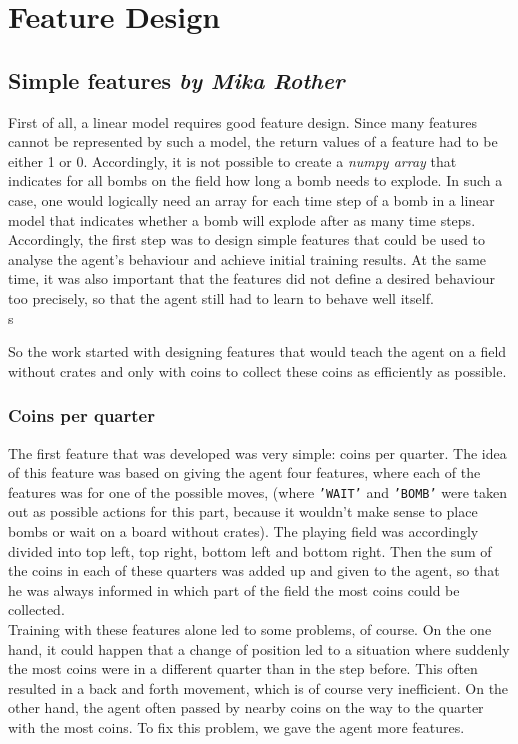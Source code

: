 \chapter{Feature Design}
\section[Simple features]{Simple features \hfill \small \normalfont\textit{by Mika Rother}}
First of all, a linear model requires good feature design. Since many features cannot be represented by such a model, the return values of a feature had to be either 1 or 0. Accordingly, it is not possible to create a \textit{numpy array} that indicates for all bombs on the field how long a bomb needs to explode. In such a case, one would logically need an array for each time step of a bomb in a linear model that indicates whether a bomb will explode after as many time steps.
\\

Accordingly, the first step was to design simple features that could be used to analyse the agent's behaviour and achieve initial training results. At the same time, it was also important that the features did not define a desired behaviour too precisely, so that the agent still had to learn to behave well itself. 
\\s

So the work started with designing features that would teach the agent on a field without crates and only with coins to collect these coins as efficiently as possible.

\subsection{Coins per quarter}
The first feature that was developed was very simple: coins per quarter. The idea of this feature was based on giving the agent four features, where each of the features was for one of the possible moves, (where \texttt{'WAIT'} and \texttt{'BOMB'} were taken out as possible actions for this part, because it wouldn't make sense to place bombs or wait on a board without crates). The playing field was accordingly divided into top left, top right, bottom left and bottom right. Then the sum of the coins in each of these quarters was added up and given to the agent, so that he was always informed in which part of the field the most coins could be collected. 
\\

Training with these features alone led to some problems, of course. On the one hand, it could happen that a change of position led to a situation where suddenly the most coins were in a different quarter than in the step before. This often resulted in a back and forth movement, which is of course very inefficient. On the other hand, the agent often passed by nearby coins on the way to the quarter with the most coins. To fix this problem, we gave the agent more features.

